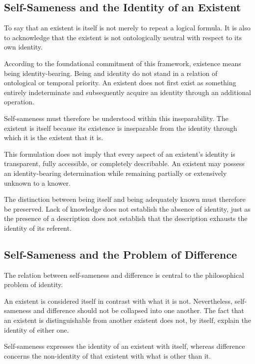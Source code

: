 \subsection{Self-Sameness and the Identity of an Existent}

To say that an existent is itself is not merely to repeat a logical formula. It is also to acknowledge that the existent is not ontologically neutral with respect to its own identity.

According to the foundational commitment of this framework, existence means being identity-bearing. Being and identity do not stand in a relation of ontological or temporal priority. An existent does not first exist as something entirely indeterminate and subsequently acquire an identity through an additional operation.

Self-sameness must therefore be understood within this inseparability. The existent is itself because its existence is inseparable from the identity through which it is the existent that it is.

This formulation does not imply that every aspect of an existent's identity is transparent, fully accessible, or completely describable. An existent may possess an identity-bearing determination while remaining partially or extensively unknown to a knower.

The distinction between being itself and being adequately known must therefore be preserved. Lack of knowledge does not establish the absence of identity, just as the presence of a description does not establish that the description exhausts the identity of its referent.

\subsection{Self-Sameness and the Problem of Difference}

The relation between self-sameness and difference is central to the philosophical problem of identity.

An existent is considered itself in contrast with what it is not. Nevertheless, self-sameness and difference should not be collapsed into one another. The fact that an existent is distinguishable from another existent does not, by itself, explain the identity of either one.

Self-sameness expresses the identity of an existent with itself, whereas difference concerns the non-identity of that existent with what is other than it.

